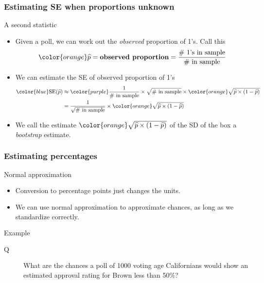 \documentclass[handout]{beamer}
\begin{document}

   \begin{frame} \frametitle{Estimating SE when proportions unknown}

   \begin{block}
   {A second statistic}
   \begin{itemize}
   \item Given a poll, we can work out the {\em observed}
   proportion of 1's. Call this
   $$
   {\color{orange} \widehat{p}} = \text{\bf observed proportion} = \frac{\text{\# 1's in sample}}{\text{\# in sample}}
   $$
   \item We can estimate the SE of observed proportion of 1's
   $$
   \begin{aligned}
   {\color{blue} \text{SE}(\widehat{p})}& \approx {\color{purple} \frac{1}{\text{\# in sample}}}  \times  \sqrt{\text{\# in sample}} \times
   {\color{orange} \sqrt{\widehat{p} \times (1 - \widehat{p})}} \\
   & = \frac{1}{\sqrt{\text{\# in sample}}} \times
   {\color{orange} \sqrt{\widehat{p} \times (1 - \widehat{p})}} \\
   \end{aligned}
   $$

   \item We call the estimate ${\color{orange} \sqrt{\widehat{p} \times (1 - \widehat{p})}}$ of the SD of the box a {\color{orange} {\em bootstrap}} estimate.

   \end{itemize}
   \end{block}
   \end{frame}


   \begin{frame} \frametitle{Estimating percentages}

   \begin{block}
   {Normal approximation}
   \begin{itemize}
   \item Conversion to percentage points just changes the units.
   \item We can use normal approximation to approximate chances,
   as long as we standardize correctly.

   \end{itemize}
   \end{block}

   \begin{block}
   {Example}
   \begin{description}
   \item[Q] What are the chances a poll of 1000 voting age Californians
   would show an estimated approval rating for Brown less than 50\%?


   \end{description}
   \end{block}
   \end{frame}
\end{document}

